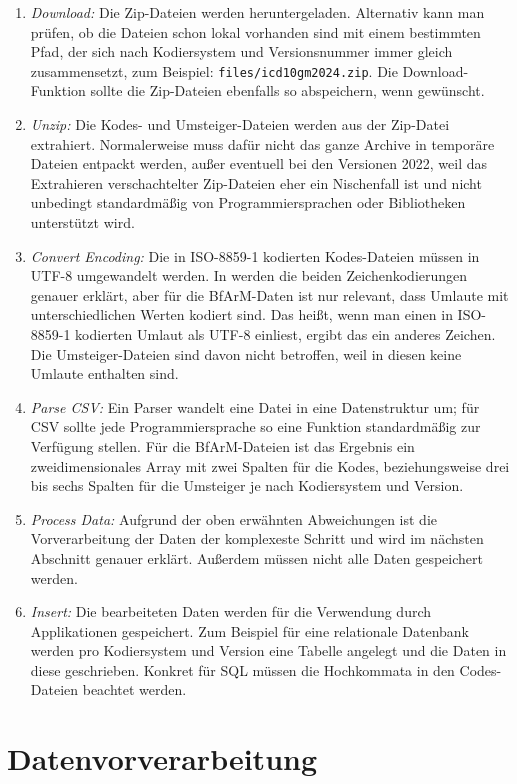 \begin{enumerate}
\item \emph{Download:} Die Zip-Dateien werden heruntergeladen. Alternativ kann man prüfen, ob die Dateien schon lokal vorhanden sind mit einem bestimmten Pfad, der sich nach Kodiersystem und Versionsnummer immer gleich zusammensetzt, zum Beispiel: \texttt{files/icd10gm2024.zip}. Die Download-Funktion sollte die Zip-Dateien ebenfalls so abspeichern, wenn gewünscht.
\item \emph{Unzip:} Die Kodes- und Umsteiger-Dateien werden aus der Zip-Datei extrahiert. Normalerweise muss dafür nicht das ganze Archive in temporäre Dateien entpackt werden, außer eventuell bei den Versionen 2022, weil das Extrahieren verschachtelter Zip-Dateien eher ein Nischenfall ist und nicht unbedingt standardmäßig von Programmiersprachen oder Bibliotheken unterstützt wird. 
\item \emph{Convert Encoding:} Die in ISO-8859-1 kodierten Kodes-Dateien müssen in UTF-8 umgewandelt werden. In \citep{charencoding} werden die beiden Zeichenkodierungen genauer erklärt, aber für die BfArM-Daten ist nur relevant, dass Umlaute mit unterschiedlichen Werten kodiert sind. Das heißt, wenn man einen in ISO-8859-1 kodierten Umlaut als UTF-8 einliest, ergibt das ein anderes Zeichen. Die Umsteiger-Dateien sind davon nicht betroffen, weil in diesen keine Umlaute enthalten sind. 
\item \emph{Parse CSV:} Ein Parser wandelt eine Datei in eine Datenstruktur um; für CSV sollte jede Programmiersprache so eine Funktion standardmäßig zur Verfügung stellen. Für die BfArM-Dateien ist das Ergebnis ein zweidimensionales Array mit zwei Spalten für die Kodes, beziehungsweise drei bis sechs Spalten für die Umsteiger je nach Kodiersystem und Version. 
\item \emph{Process Data:} Aufgrund der oben erwähnten Abweichungen ist die Vorverarbeitung der Daten der komplexeste Schritt und wird im nächsten Abschnitt genauer erklärt. Außerdem müssen nicht alle Daten gespeichert werden.
\item \emph{Insert:} Die bearbeiteten Daten werden für die Verwendung durch Applikationen gespeichert. Zum Beispiel für eine relationale Datenbank werden pro Kodiersystem und Version eine Tabelle angelegt und die Daten in diese geschrieben. Konkret für SQL müssen die Hochkommata in den Codes-Dateien beachtet werden. 
\end{enumerate}

\section{Datenvorverarbeitung}

